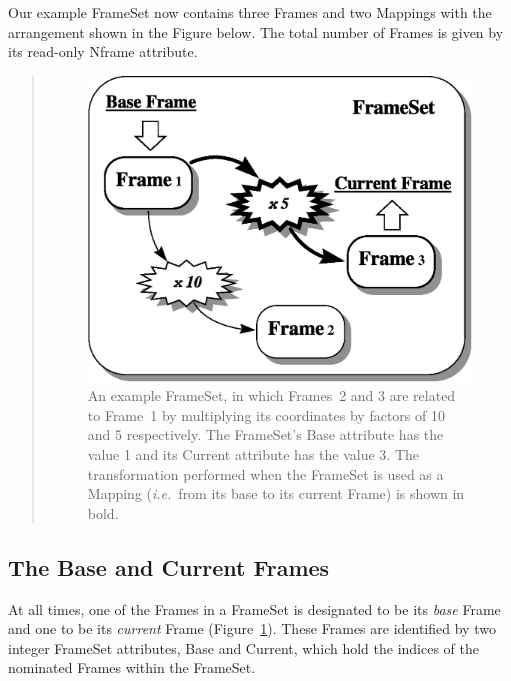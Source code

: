\documentclass[twoside,11pt]{article}
\newcommand{\htmlref}[2]{#1}
\begin{document}
\begin{htmlonly}
   Our example FrameSet now contains three Frames and two Mappings with
   the arrangement shown in the Figure below. The total number of Frames
   is given by its read-only Nframe attribute.
   \begin{quote}
   \begin{figure}
   \label{fig:fsexample}
   \includegraphics[scale=0.9]{sun210_figures/fsexample.eps}
   \caption{An example FrameSet, in which Frames~2 and 3 are related to
   Frame~1 by multiplying its coordinates by factors of 10 and 5
   respectively. The FrameSet's Base attribute has the value 1 and its
   Current attribute has the value 3. The transformation performed when
   the FrameSet is used as a Mapping ({\em{i.e.}}\ from its base to
   its current Frame) is shown in bold.}
   \end{figure}
   \end{quote}
\end{htmlonly}


\subsection{\label{ss:baseandcurrent}The Base and Current Frames}

At all times, one of the Frames in a \htmlref{FrameSet}{FrameSet} is designated to be its
{\em{base}} \htmlref{Frame}{Frame} and one to be its {\em{current}} Frame
(Figure~\ref{fig:fsexample}). These Frames are identified by two
integer FrameSet attributes, \htmlref{Base}{Base} and \htmlref{Current}{Current}, which hold the indices
of the nominated Frames within the FrameSet.
\end{document}
